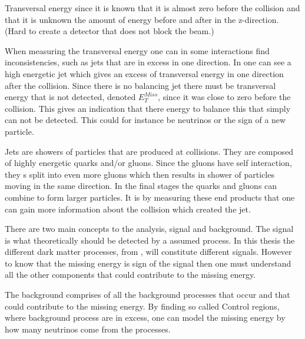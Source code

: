 Transversal energy since it is known that it is almost zero before the collision and that it is unknown the amount of energy before and after in the z-direction. (Hard to create a detector that does not block the beam.)

When measuring the transversal energy one can in some interactions find inconsistencies, such as jets that are in excess in one direction. In  one can see a high energetic jet which gives an excess of transversal energy in one direction after the collision. Since there is no balancing jet there must be transversal energy that is not detected, denoted $E_T^{Miss}$, since it was close to zero before the collision. This gives an indication that there energy to balance this that simply can not be detected. This could for instance be neutrinos or the sign of a new particle.

Jets are showers of particles that are produced at collisions. They are composed of highly energetic quarks and/or gluons. Since the gluons have self interaction, they s split into even more gluons which then results in shower of particles moving in the same direction. In the final stages the quarks and gluons can combine to form larger particles. It is by measuring these end products that one can gain more information about the collision which created the jet.

There are two main concepts to the analysis, signal and background. The signal is what theoretically should be detected by a assumed process. In this thesis the different dark matter processes, from , will constitute different signals. However to know that the missing energy is sign of the signal then one must understand all the other components that could contribute to the missing energy.

The background comprises of all the background processes that occur and that could contribute to the missing energy. By finding so called Control regions, where background process are in excess, one can model the missing energy by how many neutrinos come from the processes. 

